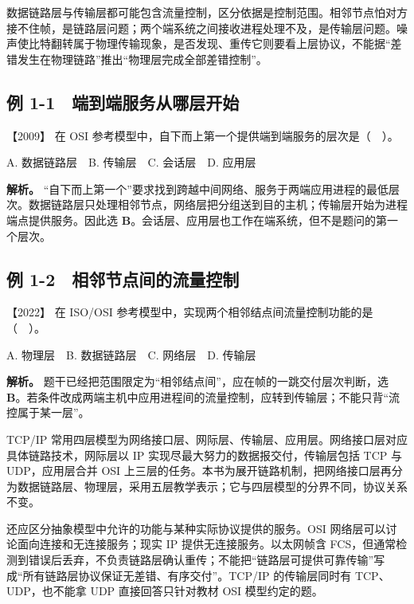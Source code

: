 数据链路层与传输层都可能包含流量控制，区分依据是控制范围。相邻节点怕对方接不住帧，是链路层问题；两个端系统之间接收进程处理不及，是传输层问题。噪声使比特翻转属于物理传输现象，是否发现、重传它则要看上层协议，不能据``差错发生在物理链路''推出``物理层完成全部差错控制''。

\subsection{例 1-1　端到端服务从哪层开始}\label{cn-ex1-1}

\noindent{}【2009】 在 OSI 参考模型中，自下而上第一个提供端到端服务的层次是（　）。

A. 数据链路层　B. 传输层　C. 会话层　D. 应用层


\textbf{解析。} ``自下而上第一个''要求找到跨越中间网络、服务于两端应用进程的最低层次。数据链路层只处理相邻节点，网络层把分组送到目的主机；传输层开始为进程端点提供服务。因此选 \textbf{B}。会话层、应用层也工作在端系统，但不是题问的第一个层次。

\subsection{例 1-2　相邻节点间的流量控制}\label{cn-ex1-2}

\noindent{}【2022】 在 ISO/OSI 参考模型中，实现两个相邻结点间流量控制功能的是（　）。

A. 物理层　B. 数据链路层　C. 网络层　D. 传输层


\textbf{解析。} 题干已经把范围限定为``相邻结点间''，应在帧的一跳交付层次判断，选 \textbf{B}。若条件改成两端主机中应用进程间的流量控制，应转到传输层；不能只背``流控属于某一层''。

TCP/IP 常用四层模型为网络接口层、网际层、传输层、应用层。网络接口层对应具体链路技术，网际层以 IP 实现尽最大努力的数据报交付，传输层包括 TCP 与 UDP，应用层合并 OSI 上三层的任务。本书为展开链路机制，把网络接口层再分为数据链路层、物理层，采用五层教学表示；它与四层模型的分界不同，协议关系不变。

还应区分抽象模型中允许的功能与某种实际协议提供的服务。OSI 网络层可以讨论面向连接和无连接服务；现实 IP 提供无连接服务。以太网帧含 FCS，但通常检测到错误后丢弃，不负责链路层确认重传；不能把``链路层可提供可靠传输''写成``所有链路层协议保证无差错、有序交付''。TCP/IP 的传输层同时有 TCP、UDP，也不能拿 UDP 直接回答只针对教材 OSI 模型约定的题。

